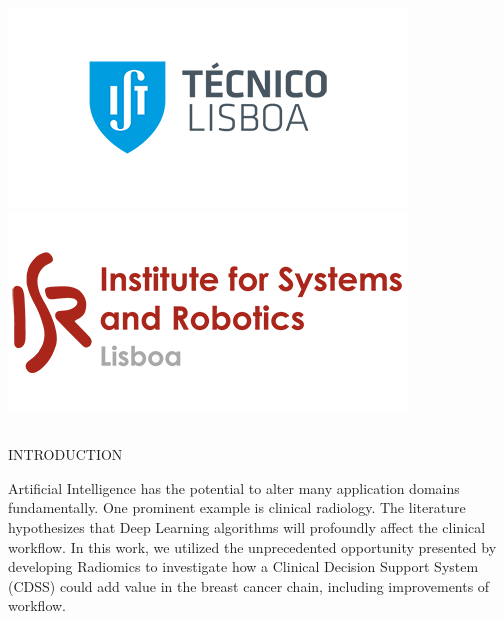 \documentclass[final]{beamer}
\begin{document}
\begin{frame}[t, fragile = singleslide]{}
\begin{columns}[t]
\begin{column}{0.18\textwidth}
\flushright
\includegraphics[width = 0.8\columnwidth]{./logos/logo003}
\vspace*{\baselineskip}
\includegraphics[width = 0.8\columnwidth]{./logos/logo004}
\end{column}

\begin{column}{0.02\textwidth}
\end{column}

\end{columns}

\begin{columns}[t]

\begin{column}{0.45\textwidth}

\begin{block}{INTRODUCTION}

Artificial Intelligence has the potential to alter many application domains fundamentally. One prominent example is clinical radiology. The literature hypothesizes that Deep Learning algorithms will profoundly affect the clinical workflow. In this work, we utilized the unprecedented opportunity presented by developing Radiomics to investigate how a Clinical Decision Support System (CDSS) could add value in the breast cancer chain, including improvements of workflow.

\end{block}


\end{column}
\end{columns}
\end{frame}
\end{document}
